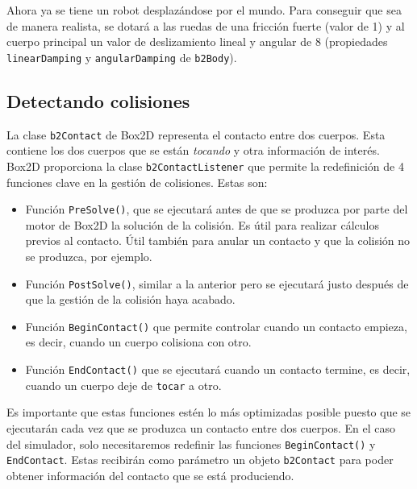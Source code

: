 Ahora ya se tiene un robot desplazándose por el mundo. Para conseguir que sea de manera realista, se dotará a las ruedas de una fricción fuerte (valor de 1) y al cuerpo principal un valor de deslizamiento lineal y angular de 8 (propiedades \texttt{linearDamping} y \texttt{angularDamping} de \texttt{b2Body}).



\subsection{Detectando colisiones}
\label{detectando-colisiones}

La clase \texttt{b2Contact} de Box2D representa el contacto entre dos cuerpos. Esta contiene los dos cuerpos que se están \emph{tocando} y otra información de interés. Box2D proporciona la clase \texttt{b2ContactListener} que permite la redefinición de 4 funciones clave en la gestión de colisiones. Estas son:

\begin{itemize}
	\item Función \texttt{PreSolve()}, que se ejecutará antes de que se produzca por parte del motor de Box2D la solución de la colisión. Es útil para realizar cálculos previos al contacto. Útil también para anular un contacto y que la colisión no se produzca, por ejemplo.
	\item Función \texttt{PostSolve()}, similar a la anterior pero se ejecutará justo después de que la gestión de la colisión haya acabado.
	\item Función \texttt{BeginContact()} que permite controlar cuando un contacto empieza, es decir, cuando un cuerpo colisiona con otro. 
	\item Función \texttt{EndContact()} que se ejecutará cuando un contacto termine, es decir, cuando un cuerpo deje de \texttt{tocar} a otro.
\end{itemize}

Es importante que estas funciones estén lo más optimizadas posible puesto que se ejecutarán cada vez que se produzca un contacto entre dos cuerpos. En el caso del simulador, solo necesitaremos redefinir las funciones \texttt{BeginContact()} y  \texttt{EndContact}. Estas recibirán como parámetro un objeto \texttt{b2Contact} para poder obtener información del contacto que se está produciendo.

